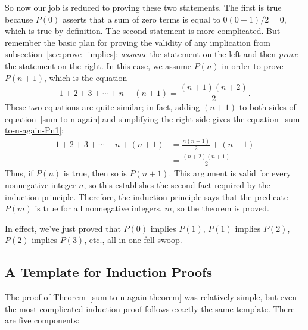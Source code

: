So now our job is reduced to proving these two statements.  The first
is true because $P(0)$ asserts that a sum of zero terms is equal to
$0(0+1)/2 = 0$, which is true by definition.
%
The second statement is more complicated.  But remember the basic plan for
proving the validity of any implication from
subsection~\ref{sec:prove_implies}: \emph{assume} the statement on 
the left and then \emph{prove} the statement on the right.  In this
case, we assume $P(n)$ in order to prove $P(n+1)$, which is the equation
\begin{equation}\label{sum-to-n-again-Pn1}
1 + 2 + 3 + \cdots + n + (n+1) = \frac{(n+1)(n+2)}{2}.
\end{equation}
These two equations are quite similar; in fact, adding $(n+1)$ to both
sides of equation~\eqref{sum-to-n-again} and simplifying the right side 
gives the equation~\eqref{sum-to-n-again-Pn1}:
\begin{align*}
1 + 2 + 3 + \cdots + n + (n+1)
    & = \frac{n(n+1)}{2} + (n+1) \\
    & = \frac{(n+2)(n+1)}{2}
\end{align*}
Thus, if $P(n)$ is true, then so is $P(n+1)$.  This argument is valid for
every nonnegative integer $n$, so this establishes the second fact
required by the induction principle.  Therefore, the induction principle
says that the predicate $P(m)$ is true for all nonnegative integers, $m$,
so the theorem is proved.

\begin{editingnotes}
In effect, we've just proved
that $P(0)$ implies $P(1)$, $P(1)$ implies $P(2)$, $P(2)$ implies
$P(3)$, etc., all in one fell swoop.
\end{editingnotes}

\subsection{A Template for Induction Proofs}
\label{templ-induct-proofs}

The proof of Theorem~\ref{sum-to-n-again-theorem} was relatively simple,
but even the most complicated induction proof follows exactly the same
template.  There are five components:

